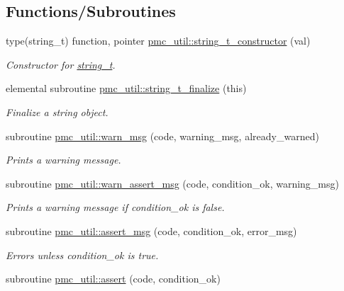 \subsection*{Functions/\+Subroutines}
\begin{DoxyCompactItemize}
\item 
type(string\+\_\+t) function, pointer \mbox{\hyperlink{namespacepmc__util_a8fc2639b0e044d6e575027b5394061aa}{pmc\+\_\+util\+::string\+\_\+t\+\_\+constructor}} (val)
\begin{DoxyCompactList}\small\item\em Constructor for \mbox{\hyperlink{structpmc__util_1_1string__t}{string\+\_\+t}}. \end{DoxyCompactList}\item 
elemental subroutine \mbox{\hyperlink{namespacepmc__util_a25291e39623c22ba97600388d04ef7a0}{pmc\+\_\+util\+::string\+\_\+t\+\_\+finalize}} (this)
\begin{DoxyCompactList}\small\item\em Finalize a string object. \end{DoxyCompactList}\item 
subroutine \mbox{\hyperlink{namespacepmc__util_a249b73ad660e5e17ec4e4ad2ff743546}{pmc\+\_\+util\+::warn\+\_\+msg}} (code, warning\+\_\+msg, already\+\_\+warned)
\begin{DoxyCompactList}\small\item\em Prints a warning message. \end{DoxyCompactList}\item 
subroutine \mbox{\hyperlink{namespacepmc__util_aca11f4bf2897a638ee7035dcc39e7524}{pmc\+\_\+util\+::warn\+\_\+assert\+\_\+msg}} (code, condition\+\_\+ok, warning\+\_\+msg)
\begin{DoxyCompactList}\small\item\em Prints a warning message if condition\+\_\+ok is false. \end{DoxyCompactList}\item 
subroutine \mbox{\hyperlink{namespacepmc__util_ab4f813625900c9949db11067af2224f2}{pmc\+\_\+util\+::assert\+\_\+msg}} (code, condition\+\_\+ok, error\+\_\+msg)
\begin{DoxyCompactList}\small\item\em Errors unless condition\+\_\+ok is true. \end{DoxyCompactList}\item 
subroutine \mbox{\hyperlink{namespacepmc__util_a4b6a3270c45469ecd16abc4c2c43e391}{pmc\+\_\+util\+::assert}} (code, condition\+\_\+ok)

\end{DoxyCompactItemize}
